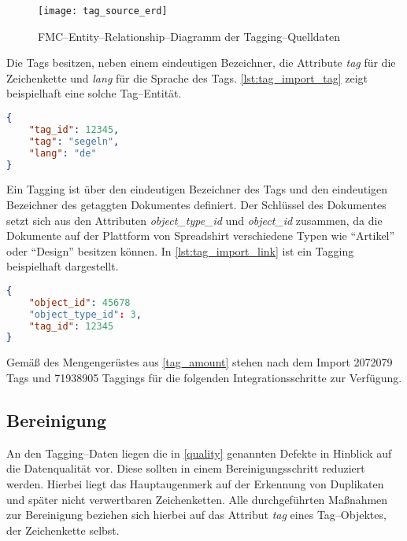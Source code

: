 \begin{figure}[h]
\centering
\texttt{[image: tag\_source\_erd]}
\caption{FMC--Entity--Relationship--Diagramm der Tagging--Quelldaten}
\label{fig:tag_source_erd}
\end{figure}

Die Tags besitzen, neben einem eindeutigen Bezeichner, die Attribute \emph{tag} für die Zeichenkette und \emph{lang} für die Sprache des Tags. \cref{lst:tag_import_tag} zeigt beispielhaft eine solche Tag--Entität.

\begin{lstlisting}[language=json, label={lst:tag_import_tag}, caption={JSON--Beispiel für einen importierten Tag}, float=h]
{
    "tag_id": 12345,
    "tag": "segeln",
    "lang": "de"
}
\end{lstlisting}

Ein Tagging ist über den eindeutigen Bezeichner des Tags und den eindeutigen Bezeichner des getaggten Dokumentes definiert. Der Schlüssel des Dokumentes setzt sich aus den Attributen \emph{object\_type\_id} und \emph{object\_id} zusammen, da die Dokumente auf der Plattform von Spreadshirt verschiedene Typen wie  ``Artikel'' oder ``Design'' besitzen können. In \cref{lst:tag_import_link} ist ein Tagging beispielhaft dargestellt.

\begin{lstlisting}[language=json, label={lst:tag_import_link}, caption={JSON--Beispiel für ein importiertes Tagging}, float=ht]
{
    "object_id": 45678
    "object_type_id": 3,
    "tag_id": 12345
}
\end{lstlisting}

Gemäß des Mengengerüstes aus \cref{tag_amount} stehen nach dem Import \num{2072079} Tags und \num{71938905} Taggings für die folgenden Integrationsschritte zur Verfügung.

\subsection{Bereinigung}

An den Tagging--Daten liegen die in \cref{quality} genannten Defekte in Hinblick auf die Datenqualität vor. Diese sollten in einem Bereinigungsschritt reduziert werden. Hierbei liegt das Hauptaugenmerk auf der Erkennung von Duplikaten und später nicht verwertbaren Zeichenketten. Alle durchgeführten Maßnahmen zur Bereinigung beziehen sich hierbei auf das Attribut \emph{tag} eines Tag--Objektes, der Zeichenkette selbst.

